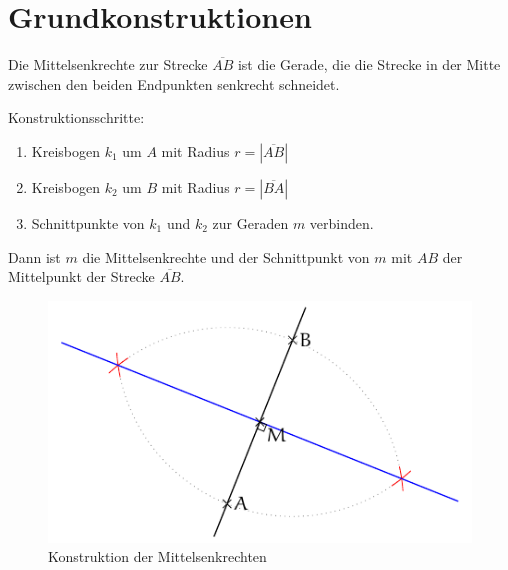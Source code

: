 \section{Grundkonstruktionen}

\begin{regel}[Mittelsenkrechte]
 
 Die Mittelsenkrechte zur Strecke \(\overline{AB}\) ist die Gerade, die die Strecke in der Mitte zwischen den beiden Endpunkten senkrecht schneidet.
 
 Konstruktionsschritte:
 \begin{enumerate}
  \item Kreisbogen \(k_1\) um \(A\) mit Radius \(r=\left|\overline{AB}\right|\)
  \item Kreisbogen \(k_2\) um \(B\) mit Radius \(r=\left|\overline{BA}\right|\)
  \item Schnittpunkte von \(k_1\) und \(k_2\) zur Geraden \(m\) verbinden. 
 \end{enumerate}
 Dann ist \(m\) die Mittelsenkrechte und der Schnittpunkt von \(m\) mit \(AB\) der Mittelpunkt der Strecke \(\overline{AB}\).

 \begin{figure}[t]
 \centering
 \includegraphics[width=.8\textwidth]{./mittelsenkrechte.pdf}
 \caption{Konstruktion der Mittelsenkrechten}
 \label{fig:mittelsenkrechte}
\end{figure}
\end{regel}

